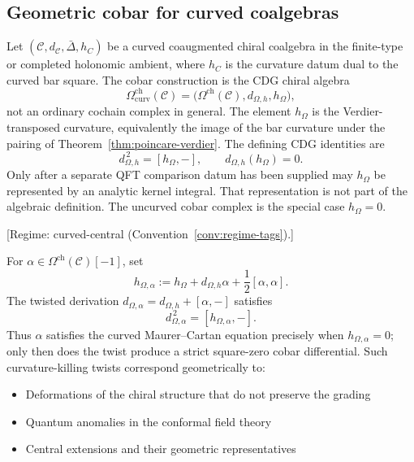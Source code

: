 \subsection{Geometric cobar for curved coalgebras}

\begin{definition}\label{def:curved-cobar}
Let $(\mathcal{C},d_\mathcal C,\bar\Delta,h_C)$ be a curved
coaugmented chiral coalgebra in the finite-type or completed
holonomic ambient, where $h_C$ is the curvature datum dual to the
curved bar square. The cobar construction is the CDG chiral algebra
\[
\Omega^{\mathrm{ch}}_{\mathrm{curv}}(\mathcal{C})
=
\bigl(\Omega^{\mathrm{ch}}(\mathcal{C}), d_{\Omega,h}, h_\Omega\bigr),
\]
not an ordinary cochain complex in general. The element $h_\Omega$ is
the Verdier-transposed curvature, equivalently the image of the bar
curvature under the pairing of Theorem~\ref{thm:poincare-verdier}.
The defining CDG identities are
\[
d_{\Omega,h}^{\,2}=[h_\Omega,-],
\qquad
d_{\Omega,h}(h_\Omega)=0.
\]
Only after a separate QFT comparison datum has been supplied may
$h_\Omega$ be represented by an analytic kernel integral. That
representation is not part of the algebraic definition. The uncurved
cobar complex is the special case $h_\Omega=0$.
\end{definition}

\begin{theorem}\label{thm:curved-mc-cobar}
\textup{[Regime: curved-central
\textup{(}Convention~\textup{\ref{conv:regime-tags})}.]}

For $\alpha \in \Omega^{\text{ch}}(\mathcal{C})[-1]$, set
\[
h_{\Omega,\alpha}
:=
h_\Omega+d_{\Omega,h}\alpha+\frac{1}{2}[\alpha,\alpha].
\]
The twisted derivation
$d_{\Omega,\alpha}=d_{\Omega,h}+[\alpha,-]$ satisfies
\[
d_{\Omega,\alpha}^{\,2}=[h_{\Omega,\alpha},-].
\]
Thus $\alpha$ satisfies the curved Maurer--Cartan equation precisely
when $h_{\Omega,\alpha}=0$; only then does the twist produce a strict
square-zero cobar differential. Such curvature-killing twists
correspond geometrically to:
\begin{itemize}
\item Deformations of the chiral structure that do not preserve the grading
\item Quantum anomalies in the conformal field theory
\item Central extensions and their geometric representatives
\end{itemize}
\end{theorem}

